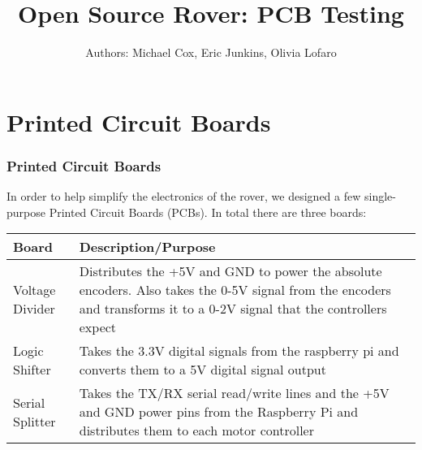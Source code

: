 \documentclass[12pt]{article}
\begin{document}
\title{Open Source Rover: PCB Testing}
\author{Authors: Michael Cox, Eric Junkins, Olivia Lofaro}

\makeatletter         
\def\@maketitle{
\begin{center}	
	\makebox[\textwidth][c]{ \texttt{[image: "Pictures/pcb title".PNG]}}
	{\Huge \bfseries \sffamily \@title }\\[3ex] 
	{\Large \sffamily \@author}\\[3ex] 
	\texttt{[image: "Pictures/Electronics/JPL logo".png]}
\end{center}}
\makeatother

\maketitle


\newpage


\tableofcontents

\newpage




\section{Printed Circuit Boards}

\subsubsection{Printed Circuit Boards}
In order to help simplify the electronics of the rover, we designed a few single-purpose Printed Circuit Boards (PCBs). In total there are three boards:
\bigskip

\begin{tabular}[2]{| p{5cm} | p{10cm} | }
	\hline
	\textbf{Board} & \textbf{Description/Purpose} \\ \hline
	Voltage Divider & Distributes the +5V and GND to power the absolute encoders. Also takes the 0-5V signal from the encoders and transforms it to a 0-2V signal that the controllers expect \\ \hline
	Logic Shifter & Takes the 3.3V digital signals from the raspberry pi and converts them to a 5V digital signal output \\ \hline
	Serial Splitter & Takes the TX/RX serial read/write lines and the +5V and GND power pins from the Raspberry Pi and distributes them to each motor controller \\ \hline
\end{tabular}
\bigskip
\end{document}
